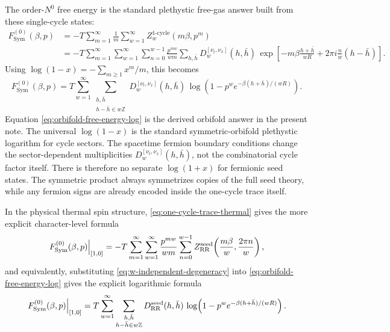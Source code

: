 \documentclass[11pt]{article}
\newcommand{\Sym}{\mathrm{Sym}}
\begin{document}
The order-$N^0$ free energy is the standard plethystic free-gas answer built from these single-cycle states:
\begin{equation}\label{eq:orbifold-free-energy-sum}
\begin{aligned}
F^{(0)}_{\Sym}(\beta,p)
&=
-T\sum_{m=1}^\infty \frac{1}{m}
\sum_{w=1}^\infty Z^{\mathrm{1\mbox{-}cycle}}_w(m\beta,p^m)
\\
&=
-T\sum_{m=1}^\infty \sum_{w=1}^\infty \sum_{n=0}^{w-1}
\frac{p^{mw}}{wm}\sum_{h,\bar h}D_w^{[\nu_t,\nu_x]}(h,\bar h)\,
\exp\!\left[
-m\beta \frac{h+\bar h}{wR}
+2\pi i \frac{n}{w}(h-\bar h)
\right].
\end{aligned}
\end{equation}
Using $\log(1-x)=-\sum_{m\ge1}x^m/m$, this becomes
\begin{equation}\label{eq:orbifold-free-energy-log}
F^{(0)}_{\Sym}(\beta,p)
=
T\sum_{w=1}^\infty
\sum_{\substack{h,\bar h\\ h-\bar h\in w\mathbb Z}}
D_w^{[\nu_t,\nu_x]}(h,\bar h)\,
\log\!\left(
1-p^w e^{-\beta(h+\bar h)/(wR)}
\right).
\end{equation}
Equation \eqref{eq:orbifold-free-energy-log} is the derived orbifold answer in the present note. The universal $\log(1-x)$ is the standard symmetric-orbifold plethystic logarithm for cycle sectors. The spacetime fermion boundary conditions change the sector-dependent multiplicities $D_w^{[\nu_t,\nu_x]}(h,\bar h)$, not the combinatorial cycle factor itself.
There is therefore no separate $\log(1+x)$ for fermionic seed states. The symmetric product always symmetrizes copies of the full seed theory, while any fermion signs are already encoded inside the one-cycle trace itself.

In the physical thermal spin structure, \eqref{eq:one-cycle-trace-thermal} gives the more explicit character-level formula
\begin{equation}\label{eq:orbifold-free-energy-character}
F^{(0)}_{\Sym}(\beta,p)\Big|_{[1,0]}
=
-T\sum_{m=1}^\infty \sum_{w=1}^\infty \frac{p^{mw}}{wm}
\sum_{n=0}^{w-1}
Z_{\rm RR}^{\mathrm{seed}}\!\left(\frac{m\beta}{w},\frac{2\pi n}{w}\right),
\end{equation}
and equivalently, substituting \eqref{eq:w-independent-degeneracy} into \eqref{eq:orbifold-free-energy-log} gives the explicit logarithmic formula
\begin{equation}\label{eq:orbifold-free-energy-thermal}
F^{(0)}_{\Sym}(\beta,p)\Big|_{[1,0]}
=
T\sum_{w=1}^\infty
\sum_{\substack{h,\bar h\\ h-\bar h\in w\mathbb Z}}
D_{\rm RR}^{\mathrm{seed}}(h,\bar h)\,
\log\!\left(
1-p^w e^{-\beta(h+\bar h)/(wR)}
\right).
\end{equation}
\end{document}
